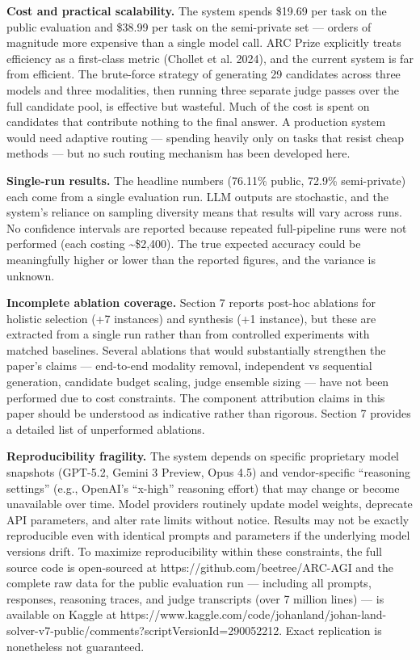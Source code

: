 \documentclass[11pt]{article}
\begin{document}
\textbf{Cost and practical scalability.} The system spends \$19.69 per
task on the public evaluation and \$38.99 per task on the semi-private
set --- orders of magnitude more expensive than a single model call. ARC
Prize explicitly treats efficiency as a first-class metric (Chollet et
al. 2024), and the current system is far from efficient. The brute-force
strategy of generating 29 candidates across three models and three
modalities, then running three separate judge passes over the full
candidate pool, is effective but wasteful. Much of the cost is spent on
candidates that contribute nothing to the final answer. A production
system would need adaptive routing --- spending heavily only on tasks
that resist cheap methods --- but no such routing mechanism has been
developed here.

\textbf{Single-run results.} The headline numbers (76.11\% public,
72.9\% semi-private) each come from a single evaluation run. LLM outputs
are stochastic, and the system's reliance on sampling diversity means
that results will vary across runs. No confidence intervals are reported
because repeated full-pipeline runs were not performed (each costing
\textasciitilde\$2,400). The true expected accuracy could be
meaningfully higher or lower than the reported figures, and the variance
is unknown.

\textbf{Incomplete ablation coverage.} Section 7 reports post-hoc
ablations for holistic selection (+7 instances) and synthesis (+1
instance), but these are extracted from a single run rather than from
controlled experiments with matched baselines. Several ablations that
would substantially strengthen the paper's claims --- end-to-end
modality removal, independent vs sequential generation, candidate budget
scaling, judge ensemble sizing --- have not been performed due to cost
constraints. The component attribution claims in this paper should be
understood as indicative rather than rigorous. Section 7 provides a
detailed list of unperformed ablations.

\textbf{Reproducibility fragility.} The system depends on specific
proprietary model snapshots (GPT-5.2, Gemini 3 Preview, Opus 4.5) and
vendor-specific ``reasoning settings'' (e.g., OpenAI's ``x-high''
reasoning effort) that may change or become unavailable over time. Model
providers routinely update model weights, deprecate API parameters, and
alter rate limits without notice. Results may not be exactly
reproducible even with identical prompts and parameters if the
underlying model versions drift. To maximize reproducibility within
these constraints, the full source code is open-sourced at
https://github.com/beetree/ARC-AGI and the complete raw data for the
public evaluation run --- including all prompts, responses, reasoning
traces, and judge transcripts (over 7 million lines) --- is available on
Kaggle at
https://www.kaggle.com/code/johanland/johan-land-solver-v7-public/comments?scriptVersionId=290052212.
Exact replication is nonetheless not guaranteed.
\end{document}
